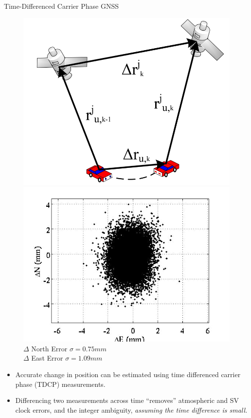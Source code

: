 \documentclass{beamer}
\begin{document}
    \begin{frame}{Time-Differenced Carrier Phase GNSS}
      \begin{figure}[ht] \centering
        \begin{minipage}[b]{0.45\linewidth}
          \includegraphics[width=\textwidth]{../graphics/tdcp_diagram.png}
          \caption{}
        \end{minipage}
        \begin{minipage}[b]{0.5\linewidth}
          \includegraphics[width=\textwidth]{../graphics/tdcp_errors.png}
          \caption{\footnotesize $\Delta$ North Error $\sigma=0.75mm$\\$\Delta$ East Error $\sigma=1.09mm$}
        \end{minipage}
      \end{figure}
      \begin{itemize} \footnotesize
        \item Accurate change in position can be estimated using time differenced carrier phase (TDCP) measurements.
        \item Differencing two measurements across time “removes” atmospheric and SV clock errors, and the integer ambiguity, \textit{assuming the time difference is small.}
      \end{itemize}
    \end{frame}
\end{document}
